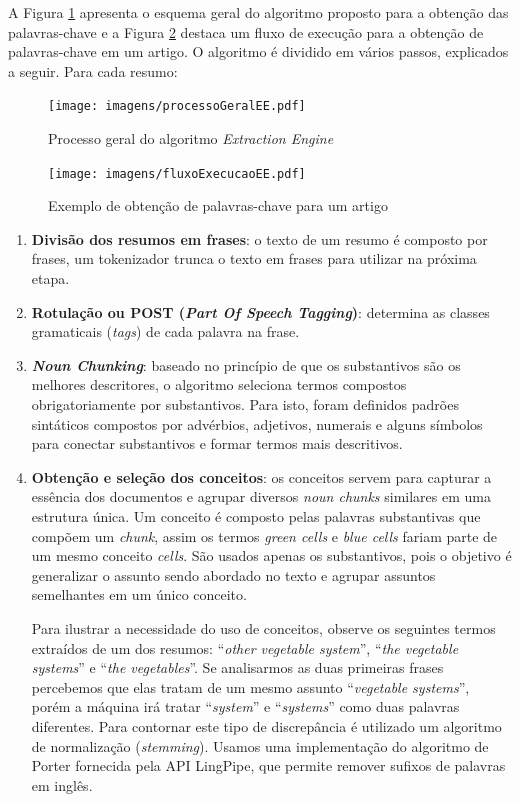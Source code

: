 A Figura \ref{fig:processoGeralEE} apresenta o esquema geral do algoritmo proposto para a obtenção das palavras-chave e a Figura \ref{fig:fluxoExecucaoEE} destaca um fluxo de execução para a obtenção de palavras-chave em um artigo. O algoritmo é dividido em vários passos, explicados a seguir. Para cada resumo:
\begin{figure}[h!]
    \center
    \texttt{[image: imagens/processoGeralEE.pdf]}
    \caption{Processo geral do algoritmo \emph{Extraction Engine} \label{fig:processoGeralEE}}
\end{figure}
\begin{figure}[h!]
    \center
    \texttt{[image: imagens/fluxoExecucaoEE.pdf]}
    \caption{Exemplo de obtenção de palavras-chave para um artigo \label{fig:fluxoExecucaoEE}}
\end{figure}
\begin{enumerate}
    \item \textbf{Divisão dos resumos em frases}: o texto de um resumo é composto por frases, um tokenizador trunca o texto em frases para utilizar na próxima etapa.

    \item \textbf{Rotulação ou POST (\emph{Part Of Speech Tagging})}: determina as classes gramaticais (\emph{tags}) de cada palavra na frase.

    \item \textbf{\emph{Noun Chunking}}: baseado no princípio de que os substantivos são os melhores descritores, o algoritmo seleciona termos compostos obrigatoriamente por substantivos. Para isto, foram definidos padrões sintáticos compostos por advérbios, adjetivos, numerais e alguns símbolos para conectar substantivos e formar termos mais descritivos.

    \item \textbf{Obtenção e seleção dos conceitos}: os conceitos servem para capturar a essência dos documentos e agrupar diversos \emph{noun chunks} similares em uma estrutura única. Um conceito é composto pelas palavras substantivas que compõem um \emph{chunk}, assim os termos \emph{green cells} e \emph{blue cells} fariam parte de um mesmo conceito \emph{cells}. São usados apenas os substantivos, pois o objetivo é generalizar o assunto sendo abordado no texto e agrupar assuntos semelhantes em um único conceito.

Para ilustrar a necessidade do uso de conceitos, observe os seguintes termos extraídos de um dos resumos: “\emph{other vegetable system}”, “\emph{the vegetable systems}” e “\emph{the vegetables}”. Se analisarmos as duas primeiras frases percebemos que elas tratam de um mesmo assunto “\emph{vegetable systems}”, porém a máquina irá tratar “\emph{system}”  e “\emph{systems}”  como duas palavras diferentes. Para contornar este tipo de discrepância é utilizado um algoritmo de normalização (\emph{stemming}). Usamos uma implementação do algoritmo de Porter \cite{Porter1980} fornecida pela API LingPipe, que permite remover sufixos de palavras em inglês.


\end{enumerate}
